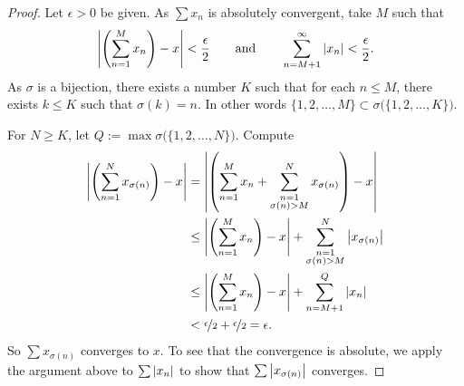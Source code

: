 \begin{proof}
Let $\epsilon > 0$ be given.  As $\sum x_n$ is absolutely convergent, take $M$ such that
\begin{equation*}
\left\lvert {\left(\sum_{n=1}^M x_n \right) - x} \right\rvert < \frac{\epsilon}{2}
\qquad \text{and} \qquad
\sum_{n=M+1}^\infty \left\lvert {x_n} \right\rvert < \frac{\epsilon}{2} .
\end{equation*}
As $\sigma$ is a bijection,
there exists a number $K$ such that for each
$n \leq M$, there exists $k \leq K$ such that $\sigma(k) = n$.
In other words
$\{ 1,2,\ldots,M \} \subset \sigma\bigl(\{ 1,2,\ldots,K \} \bigr)$.

For $N \geq K$, let $Q := \max \sigma\bigl(\{ 1,2,\ldots,N \}\bigr)$.
Compute
\begin{equation*}
\begin{split}
\left\lvert {\left( \sum_{n=1}^N x_{\sigma(n)} \right) - x} \right\rvert
& =
\left\lvert { \left( \sum_{n=1}^M x_n
+
\sum_{\substack{n=1\\\sigma(n) > M}}^N x_{\sigma(n)} \right) - x} \right\rvert
\\
& \leq
\left\lvert { \left( \sum_{n=1}^M x_n \right) - x} \right\rvert
+
\sum_{\substack{n=1\\\sigma(n) > M}}^N \left\lvert {x_{\sigma(n)}} \right\rvert
\\
& \leq
\left\lvert { \left( \sum_{n=1}^M x_n \right) - x} \right\rvert
+
\sum_{n=M+1}^Q \left\lvert {x_{n}} \right\rvert
\\
& < \nicefrac{\epsilon}{2} + \nicefrac{\epsilon}{2} = \epsilon .
\end{split}
\end{equation*}
So 
$\sum x_{\sigma(n)}$ converges to $x$.  To see that the convergence
is absolute, we apply the argument above to $\sum \left\lvert {x_n} \right\rvert$ to show
that $\sum \left\lvert {x_{\sigma(n)}} \right\rvert$ converges.
\end{proof}

